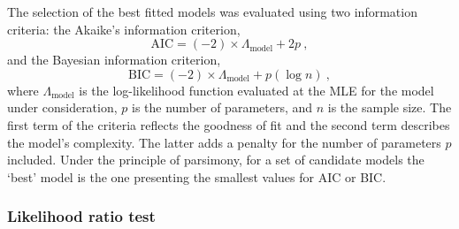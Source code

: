 The selection of the best fitted models was evaluated using two information criteria: the Akaike's information criterion,
%
\begin{equation}
    \label{eq:aic}
    \text{AIC}=(-2)\times\Lambda_{\text{model}}+2p\ ,
\end{equation}
%
\noindent
and the Bayesian information criterion,
%
\begin{equation}
    \label{eq:bic}
    \text{BIC}=(-2)\times\Lambda_{\text{model}}+p(\log n)\ ,
\end{equation}
%
\noindent
where $\Lambda_{\text{model}}$ is the log-likelihood function evaluated at the MLE for the model under consideration, $p$ is the number of parameters, and $n$ is the sample size.
The first term of the criteria reflects the goodness of fit and the second term describes the model's complexity.
The latter adds a penalty for the number of parameters $p$ included. %
Under the principle of parsimony, for a set of candidate models the `best' model is the one presenting the smallest values for AIC or BIC. 



\subsubsection{Likelihood ratio test}

